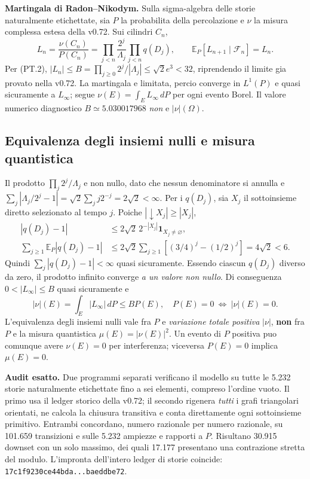 \documentclass[11pt,a4paper]{article}
\begin{document}
\textbf{Martingala di Radon--Nikodym.} Sulla sigma-algebra delle storie naturalmente etichettate, sia $P$ la probabilita della percolazione e $\nu$ la misura complessa estesa della v0.72. Sui cilindri $C_n$,
\begin{equation}
L_n=\frac{\nu(C_n)}{P(C_n)}=
\prod_{j<n}\frac{2^j}{\Lambda_j}\prod_{j<n}q(D_j),\qquad
\mathbb{E}_{P}[L_{n+1}\mid\mathcal F_n]=L_n.
\tag{PT.3}
\end{equation}
Per (PT.2), $|L_n|\le B=\prod_{j\ge0}2^j/|\Lambda_j|\le\sqrt2 e^3<32$, riprendendo il limite gia provato nella v0.72. La martingala e limitata, percio converge in $L^1(P)$ e quasi sicuramente a $L_\infty$; segue $\nu(E)=\int_E L_\infty\,dP$ per ogni evento Borel. Il valore numerico diagnostico $B\simeq5.030017968$ \emph{non} e $|\nu|(\Omega)$.

\clearpage
\subsection*{Equivalenza degli insiemi nulli e misura quantistica}
Il prodotto $\prod_j2^j/\Lambda_j$ e non nullo, dato che nessun denominatore si annulla e $\sum_j|\Lambda_j/2^j-1|=\sqrt2\sum_j j2^{-j}=2\sqrt2<\infty$. Per i $q(D_j)$, sia $X_j$ il sottoinsieme diretto selezionato al tempo $j$. Poiche $|\downarrow X_j|\ge|X_j|$,
\begin{equation}
\begin{split}
|q(D_j)-1|&\le2\sqrt2\,2^{-|X_j|}\mathbf{1}_{X_j\ne\varnothing},\\
\sum_{j\ge1}\mathbb E_P|q(D_j)-1|&\le2\sqrt2\sum_{j\ge1}\left[(3/4)^j-(1/2)^j\right]=4\sqrt2<6.
\end{split}\tag{PT.4}
\end{equation}
Quindi $\sum_j|q(D_j)-1|<\infty$ quasi sicuramente. Essendo ciascun $q(D_j)$ diverso da zero, il prodotto infinito converge \emph{a un valore non nullo}. Di conseguenza $0<|L_\infty|\le B$ quasi sicuramente e
\begin{equation}
\boxed{\qquad|\nu|(E)=\int_E|L_\infty|\,dP\le B P(E),\quad
P(E)=0\ \Longleftrightarrow\ |\nu|(E)=0.\qquad}
\tag{PT.5}
\end{equation}
L'equivalenza degli insiemi nulli vale fra $P$ e \emph{variazione totale positiva} $|\nu|$, \textbf{non} fra $P$ e la misura quantistica $\mu(E)=|\nu(E)|^2$. Un evento di $P$ positiva puo comunque avere $\nu(E)=0$ per interferenza; viceversa $P(E)=0$ implica $\mu(E)=0$.

\textbf{Audit esatto.} Due programmi separati verificano il modello su tutte le 5.232 storie naturalmente etichettate fino a sei elementi, compreso l'ordine vuoto. Il primo usa il ledger storico della v0.72; il secondo rigenera \emph{tutti} i grafi triangolari orientati, ne calcola la chiusura transitiva e conta direttamente ogni sottoinsieme primitivo. Entrambi concordano, numero razionale per numero razionale, su 101.659 transizioni e sulle 5.232 ampiezze e rapporti a $P$. Risultano 30.915 downset con un solo massimo, dei quali 17.177 presentano una contrazione stretta del modulo. L'impronta dell'intero ledger di storie coincide: \texttt{17c1f9230ce44bda...baeddbe72}.
\end{document}

